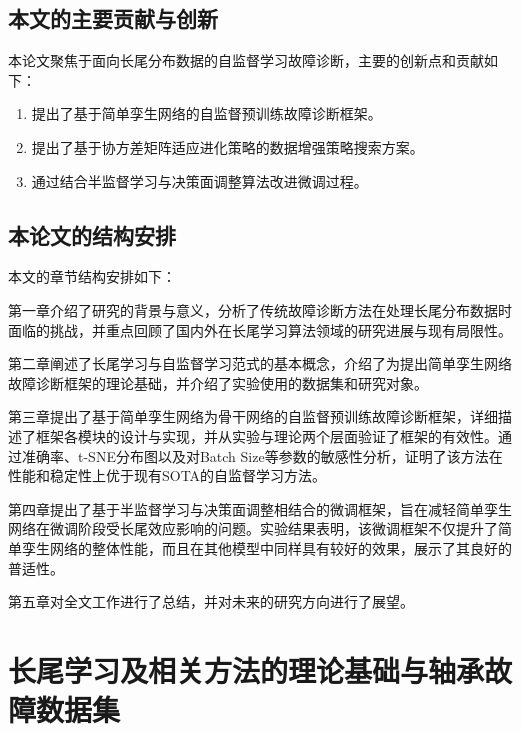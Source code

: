 \documentclass[master]{thesis-uestc}
\begin{document}
\section{本文的主要贡献与创新}

本论文聚焦于面向长尾分布数据的自监督学习故障诊断，主要的创新点和贡献如下：

\begin{enumerate}[label={(\arabic*)}]
    \item 提出了基于简单孪生网络的自监督预训练故障诊断框架。
    \item 提出了基于协方差矩阵适应进化策略的数据增强策略搜索方案。
    \item 通过结合半监督学习与决策面调整算法改进微调过程。
\end{enumerate}

\section{本论文的结构安排}

本文的章节结构安排如下：

第一章介绍了研究的背景与意义，分析了传统故障诊断方法在处理长尾分布数据时面临的挑战，并重点回顾了国内外在长尾学习算法领域的研究进展与现有局限性。

第二章阐述了长尾学习与自监督学习范式的基本概念，介绍了为提出简单孪生网络故障诊断框架的理论基础，并介绍了实验使用的数据集和研究对象。

第三章提出了基于简单孪生网络为骨干网络的自监督预训练故障诊断框架，详细描述了框架各模块的设计与实现，并从实验与理论两个层面验证了框架的有效性。通过准确率、t-SNE分布图以及对Batch Size等参数的敏感性分析，证明了该方法在性能和稳定性上优于现有SOTA的自监督学习方法。

第四章提出了基于半监督学习与决策面调整相结合的微调框架，旨在减轻简单孪生网络在微调阶段受长尾效应影响的问题。实验结果表明，该微调框架不仅提升了简单孪生网络的整体性能，而且在其他模型中同样具有较好的效果，展示了其良好的普适性。

第五章对全文工作进行了总结，并对未来的研究方向进行了展望。


\chapter{长尾学习及相关方法的理论基础与轴承故障数据集}
\end{document}
